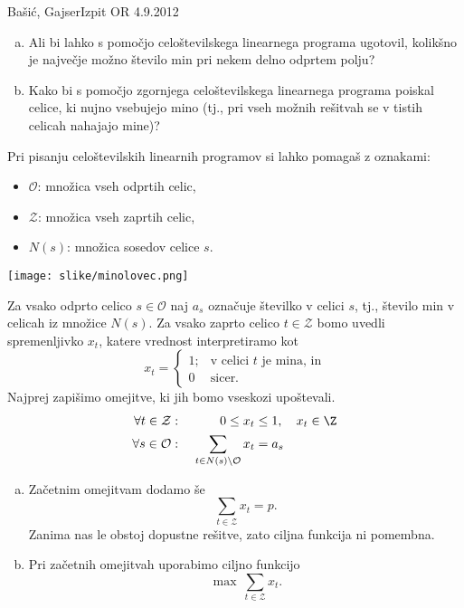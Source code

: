 \begin{naloga}{Bašić, Gajser}{Izpit OR 4.9.2012}
\begin{vprasanje}
\begin{enumerate}[(a)]
\item Ali bi lahko s pomočjo celoštevilskega linearnega programa ugotovil,
kolikšno je največje možno število min pri nekem delno odprtem polju?

\item Kako bi s pomočjo zgornjega celoštevilskega linearnega programa
poiskal celice, ki nujno vsebujejo mino
(tj., pri vseh možnih rešitvah se v tistih celicah nahajajo mine)?
\end{enumerate}
Pri pisanju celoštevilskih linearnih programov si lahko pomagaš z oznakami:
\begin{itemize}
\item ${\mathcal O}$: množica vseh odprtih celic,
\item ${\mathcal Z}$: množica vseh zaprtih celic,
\item $N(s)$: množica sosedov celice $s$.
\end{itemize}

\begin{slika}
\texttt{[image: slike/minolovec.png]}
\end{slika}
\end{vprasanje}

\begin{odgovor}
Za vsako odprto celico $s \in {\mathcal O}$
naj $a_s$ označuje številko v celici $s$,
tj., število min v celicah iz množice $N(s)$.
Za vsako zaprto celico $t \in {\mathcal Z}$ bomo uvedli spremenljivko $x_t$,
katere vrednost interpretiramo kot
$$
x_t = \begin{cases}
1; & \text{v celici $t$ je mina, in} \\
0  & \text{sicer.}
\end{cases}
$$
Najprej zapišimo omejitve, ki jih bomo vseskozi upoštevali.
\begin{alignat*}{2}
\forall t \in {\mathcal Z}: &\ & 0 \le x_t &\le 1, \quad x_t \in \Z \\
\forall s \in {\mathcal O}: &\ &
\sum_{t \in N(s) \setminus {\mathcal O}} x_t &= a_s
\end{alignat*}

\begin{enumerate}[(a)]
\item Začetnim omejitvam dodamo še
$$
\sum_{t \in {\mathcal Z}} x_t = p .
$$
Zanima nas le obstoj dopustne rešitve,
zato ciljna funkcija ni pomembna.

\item Pri začetnih omejitvah uporabimo ciljno funkcijo
$$
\max \ \sum_{t \in {\mathcal Z}} x_t .
$$


\end{enumerate}
\end{odgovor}
\end{naloga}
